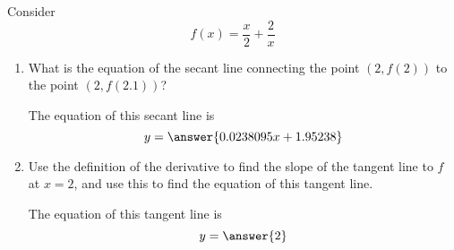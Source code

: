 \documentclass[handout]{ximera}
\begin{document}
\begin{exercise}
Consider 
\[
f(x) = \frac{x}{2}+\frac{2}{x}
\]

\begin{enumerate}
\item What is the equation of the secant line connecting the point $(2,f(2))$ to the point $(2,f(2.1))$? 
\begin{prompt} 
The equation of this secant line is
$$ y = \answer{0.0238095x+1.95238 }$$ 
\end{prompt}

\item  Use the definition of the derivative to find the slope of the tangent line to $f$ at $x=2$, and use this to find the equation of this tangent line.

\begin{prompt} 
The equation of this tangent line is
$$ y = \answer{2}$$ 
\end{prompt}

\end{enumerate}

\end{exercise}
\end{document}
